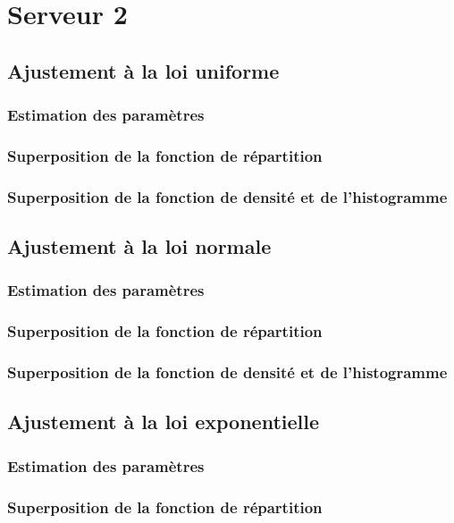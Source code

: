 \documentclass{article}
\begin{document}
\section{Serveur 2}

\subsection{Ajustement à la loi uniforme}

\subsubsection{Estimation des paramètres}
\subsubsection{Superposition de la fonction de répartition}
\subsubsection{Superposition de la fonction de densité et de l'histogramme}

\subsection{Ajustement à la loi normale}

\subsubsection{Estimation des paramètres}
\subsubsection{Superposition de la fonction de répartition}
\subsubsection{Superposition de la fonction de densité et de l'histogramme}

\subsection {Ajustement à la loi exponentielle}

\subsubsection{Estimation des paramètres}
\subsubsection{Superposition de la fonction de répartition}
\end{document}
